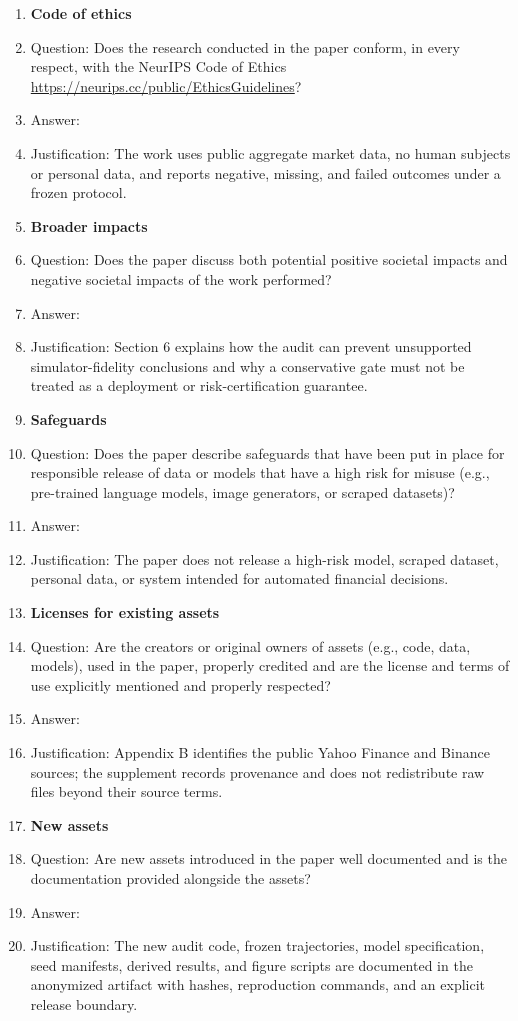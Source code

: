 \begin{enumerate}
\item {\bf Code of ethics}
    \item[] Question: Does the research conducted in the paper conform, in every respect, with the NeurIPS Code of Ethics \url{https://neurips.cc/public/EthicsGuidelines}?
    \item[] Answer: \answerYes{}
    \item[] Justification: The work uses public aggregate market data, no human subjects or personal data, and reports negative, missing, and failed outcomes under a frozen protocol.

\item {\bf Broader impacts}
    \item[] Question: Does the paper discuss both potential positive societal impacts and negative societal impacts of the work performed?
    \item[] Answer: \answerYes{}
    \item[] Justification: Section 6 explains how the audit can prevent unsupported simulator-fidelity conclusions and why a conservative gate must not be treated as a deployment or risk-certification guarantee.

\item {\bf Safeguards}
    \item[] Question: Does the paper describe safeguards that have been put in place for responsible release of data or models that have a high risk for misuse (e.g., pre-trained language models, image generators, or scraped datasets)?
    \item[] Answer: \answerNA{}
    \item[] Justification: The paper does not release a high-risk model, scraped dataset, personal data, or system intended for automated financial decisions.

\item {\bf Licenses for existing assets}
    \item[] Question: Are the creators or original owners of assets (e.g., code, data, models), used in the paper, properly credited and are the license and terms of use explicitly mentioned and properly respected?
    \item[] Answer: \answerYes{}
    \item[] Justification: Appendix B identifies the public Yahoo Finance and Binance sources; the supplement records provenance and does not redistribute raw files beyond their source terms.

\item {\bf New assets}
    \item[] Question: Are new assets introduced in the paper well documented and is the documentation provided alongside the assets?
    \item[] Answer: \answerYes{}
    \item[] Justification: The new audit code, frozen trajectories, model specification, seed manifests, derived results, and figure scripts are documented in the anonymized artifact with hashes, reproduction commands, and an explicit release boundary.


\end{enumerate}

